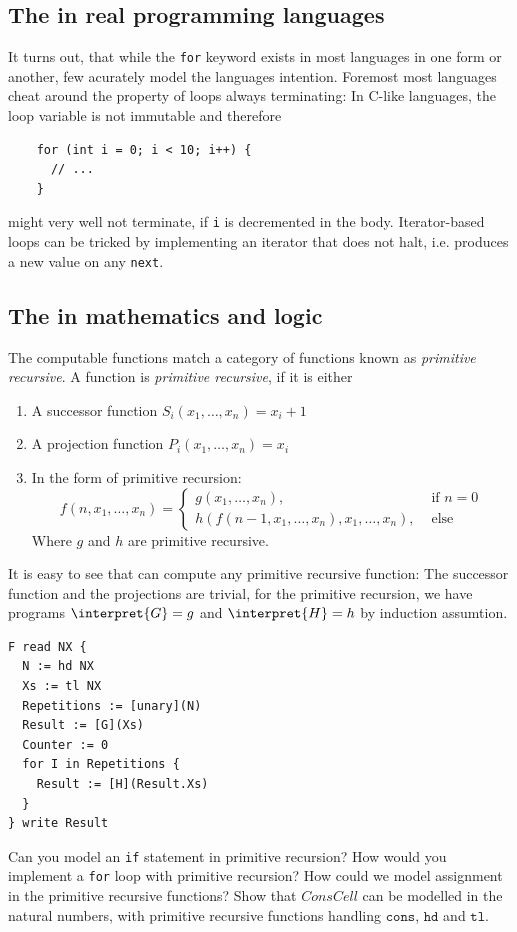 \subsection{The \FOR in real programming languages}
It turns out, that while the {\tt for} keyword exists in most languages in 
one form or another, few acurately model the \FOR languages intention. 
Foremost most languages cheat around the property of \FOR loops always 
terminating: In C-like languages, the loop variable is not immutable and therefore
\begin{verbatim}
	for (int i = 0; i < 10; i++) {
	  // ...
	}
\end{verbatim}
might very well not terminate, if {\tt i} is decremented in the body. 
Iterator-based loops can be tricked by implementing an iterator that does not 
halt, i.e. produces a new value on any {\tt next}.

\subsection{The \FOR in mathematics and logic}
The \FOR computable functions match a category of functions known as 
{\em primitive recursive}. A function is {\em primitive recursive}, if it is either
\begin{enumerate}
	\item A successor function $S_i(x_1,\dots,x_n) = x_i+1$
	\item A projection function $P_i(x_1,\dots,x_n) = x_i$
	\item In the form of primitive recursion:
		\begin{equation*}
			f(n,x_1,\dots,x_n) = \begin{cases}
				g(x_1,\dots,x_n), &\text{ if }n=0\\
				h(f(n-1, x_1, \dots, x_n), x_1,\dots,x_n),&\text{ else}
			\end{cases}
		\end{equation*}
		Where $g$ and $h$ are primitive recursive.
\end{enumerate}
It is easy to see that \FOR can compute any primitive recursive function:
The successor function and the projections are trivial, for the primitive 
recursion, we have programs $\interpret{G}=g$ and $\interpret{H}=h$ by 
induction assumtion. 

\begin{verbatim}
F read NX {
  N := hd NX
  Xs := tl NX
  Repetitions := [unary](N)
  Result := [G](Xs)
  Counter := 0
  for I in Repetitions {
    Result := [H](Result.Xs)
  }
} write Result
\end{verbatim}

\begin{Exercise}[title={\FOR computable functions are primitive recursive}]
	\Question Can you model an {\tt if} statement in primitive recursion?
	\Question How would you implement a {\tt for} loop with primitive recursion?
	\Question How could we model assignment in the primitive recursive functions?
	 Show that $ConsCell$ can be modelled in the 
		natural numbers, with primitive recursive functions handling $\mathtt{cons}$, 
		$\mathtt{hd}$ and $\mathtt{tl}$.
\end{Exercise}
